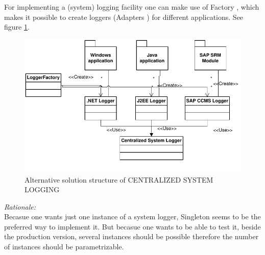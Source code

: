 For implementing a (system) logging facility one can make use of {\sc  Factory} \cite{Gamma95}, which makes it possible to create loggers ({\sc  Adapters} \cite{Gamma95}) for different applications. See figure \ref{fig:systemLogging}. 
\begin{figure}[h]
\centering
\includegraphics{patterns/systemLoggingDiagram.pdf}
\caption{Alternative solution structure of CENTRALIZED SYSTEM LOGGING}
\label{fig:systemLogging}
\end{figure}


\pagebreak[4]
\begin{center}
   
\end{center}

\textit{Rationale:}\\
Becasue one wants just one instance of a system logger, {\sc  Singleton} \cite{Gamma95} seems to be the preferred way to implement it. But becasue one wants to be able to test  it, beside the production version, several instances should be possible therefore the number of instances should be parametrizable.\\

